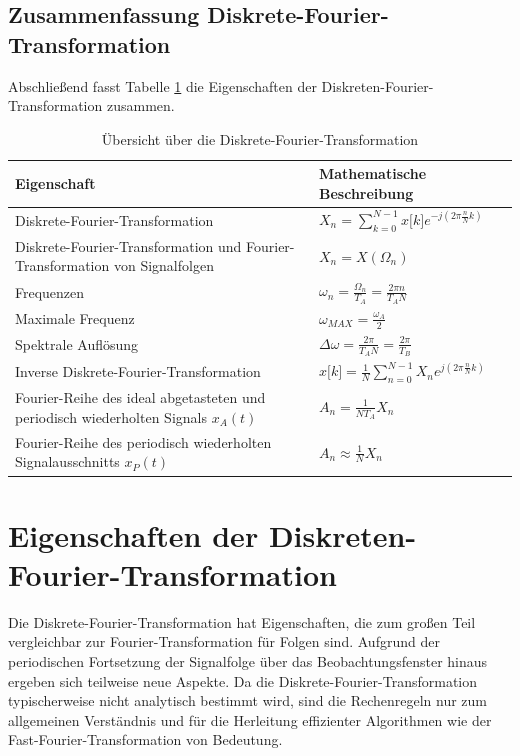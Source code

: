 \subsection{Zusammenfassung Diskrete-Fourier-Transformation}\label{sec:zusammenfassung-diskrete-fourier-transformation}

Abschließend fasst Tabelle \ref{tab:10.2} die Eigenschaften der Diskreten-Fourier-Transformation zusammen.

\begin{table}
  \centering
  \caption{Übersicht über die Diskrete-Fourier-Transformation}
  \label{tab:10.2}
  \begin{tabular}{ll}
    \toprule
    Eigenschaft & Mathematische Beschreibung \\
    \midrule
    Diskrete-Fourier-Transformation & \(X_{n} = \sum\limits_{k = 0}^{N - 1}{x\lbrack k\rbrack  e^{- j  \left( 2  \pi  \frac{n}{N}  k \right)}}\ \) \\
    Diskrete-Fourier-Transformation und 
Fourier-Transformation von Signalfolgen
 & \(X_{n} = X\left( \Omega_{n} \right)\) \\
    Frequenzen & \(\omega_{n} = \frac{\Omega_{n}}{T_{A}} = \frac{2  \pi  n}{T_{A}  N}\) \\
    Maximale Frequenz & \(\omega_{MAX} = \frac{\omega_{A}}{2}\) \\
    Spektrale Auflösung & \(\Delta\omega = \frac{2  \pi}{T_{A}  N} = \frac{2  \pi}{T_{B}}\) \\
    Inverse Diskrete-Fourier-Transformation & \(x\lbrack k\rbrack = \frac{1}{N}  \sum\limits_{n = 0}^{N - 1}X_{n}  e^{j  \left( 2  \pi  \frac{n}{N}  k \right)}\) \\
    Fourier-Reihe des ideal abgetasteten und 
periodisch wiederholten Signals \(x_{A}(t)\)
 & \(A_{n} = \frac{1}{N  T_{A}}  X_{n}\) \\
    Fourier-Reihe des periodisch wiederholten 
Signalausschnitts \(x_{P}(t)\)
 & \(A_{n} \approx \frac{1}{N}  X_{n}\) \\
    \bottomrule
  \end{tabular}
\end{table}

\section{Eigenschaften der Diskreten-Fourier-Transformation}\label{sec:10.2}

Die Diskrete-Fourier-Transformation hat Eigenschaften, die zum großen Teil vergleichbar zur Fourier-Transformation für Folgen sind. Aufgrund der periodischen Fortsetzung der Signalfolge über das Beobachtungsfenster hinaus ergeben sich teilweise neue Aspekte. Da die Diskrete-Fourier-Transformation typischerweise nicht analytisch bestimmt wird, sind die Rechenregeln nur zum allgemeinen Verständnis und für die Herleitung effizienter Algorithmen wie der Fast-Fourier-Transformation von Bedeutung.

